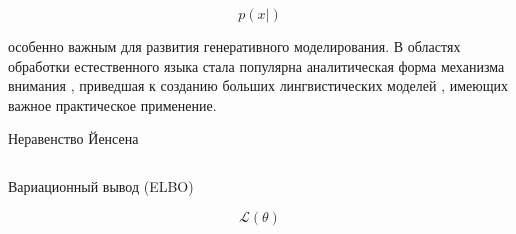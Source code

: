 $$
    p(x|)
$$


особенно важным для развития генеративного моделирования.
В областях обработки естественного языка стала популярна аналитическая форма механизма внимания \cite{vaswani2017attention},
приведшая к созданию больших лингвистических моделей \cite{radford2019language}, имеющих важное практическое применение.

Неравенство Йенсена 

$$
$$





Вариационный вывод (ELBO)

$$
    \mathcal{L}(\theta)
$$


